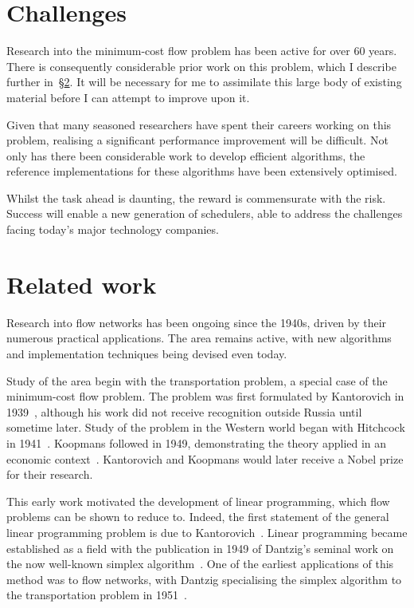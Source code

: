 \section{Challenges} \label{sec:intro-challenges}
Research into the minimum-cost flow problem has been active for over 60 years. There is consequently considerable prior work on this problem, which I describe further in~\S\ref{sec:intro-related-work}. It will be necessary for me to assimilate this large body of existing material before I can attempt to improve upon it.

Given that many seasoned researchers have spent their careers working on this problem, realising a significant performance improvement will be difficult. Not only has there been considerable work to develop efficient algorithms, the reference implementations for these algorithms have been extensively optimised.

Whilst the task ahead is daunting, the reward is commensurate with the risk. Success will enable a new generation of schedulers, able to address the challenges facing today's major technology companies.

\section{Related work} \label{sec:intro-related-work}

Research into flow networks has been ongoing since the 1940s, driven by their numerous practical applications. The area remains active, with new algorithms and implementation techniques being devised even today.

Study of the area begin with the transportation problem, a special case of the minimum-cost flow problem. The problem was first formulated by Kantorovich in 1939~\cite{Kantorovich:1960}, although his work did not receive recognition outside Russia until sometime later. Study of the problem in the Western world began with Hitchcock in 1941~\cite{Hitchcock:1941}. Koopmans followed in 1949, demonstrating the theory applied in an economic context~\cite{Koopmans:1949}. Kantorovich and Koopmans would later receive a Nobel prize for their research\footnotemark.

This early work motivated the development of linear programming, which flow problems can be shown to reduce to. Indeed, the first statement of the general linear programming problem is due to Kantorovich~\cite{Kantorovich:1960}. Linear programming became established  as a field with the publication in 1949 of Dantzig's seminal work on the now well-known simplex algorithm~\cite{Dantzig:1949}. One of the earliest applications of this method was to flow networks, with Dantzig specialising the simplex algorithm to the transportation problem in 1951~\cite{Dantzig:1951}.

